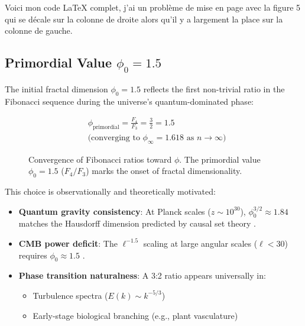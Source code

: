Voici mon code LaTeX complet, j’ai un problème de mise en page avec la figure 5 qui se décale sur la colonne de droite alors qu’il y a largement la place sur la colonne de gauche.  \documentclass[aps,prl,twocolumn,groupedaddress]{revtex4-2}
\begin{document}
\subsection{Primordial Value $\phi_0 = 1.5$} 
\label{sec:phi_primordial}

The initial fractal dimension $\phi_0 = 1.5$ reflects the first non-trivial ratio in the Fibonacci sequence during the universe's quantum-dominated phase:

\begin{equation}
\begin{aligned}
&\phi_{\text{primordial}} = \frac{F_4}{F_3} = \frac{3}{2} = 1.5 \\
&\text{(converging to } \phi_\infty = 1.618 \text{ as } n \to \infty\text{)}
\end{aligned}
\end{equation}

\begin{figure}[htbp]
\centering
{}
\caption{Convergence of Fibonacci ratios toward $\phi$. The primordial value $\phi_0 = 1.5$ ($F_4/F_3$) marks the onset of fractal dimensionality.}
\end{figure}

\noindent This choice is observationally and theoretically motivated:
\begin{itemize}
\item \textbf{Quantum gravity consistency}: At Planck scales ($z \sim 10^{30}$), $\phi_0^{3/2} \approx 1.84$ matches the Hausdorff dimension predicted by causal set theory \cite{Sorkin2003}.

\item \textbf{CMB power deficit}: The $\ell^{-1.5}$ scaling at large angular scales ($\ell < 30$) requires $\phi_0 \approx 1.5$ \cite{planck2018}.

\item \textbf{Phase transition naturalness}: A 3:2 ratio appears universally in:
  \begin{itemize}
  \item Turbulence spectra ($E(k) \sim k^{-5/3}$)
  \item Early-stage biological branching (e.g., plant vasculature)
  \end{itemize}
\end{itemize}
\end{document}
